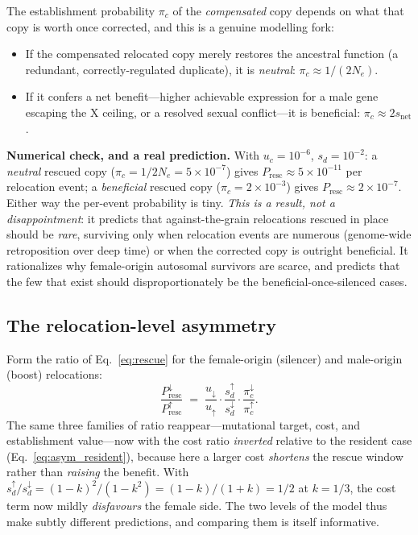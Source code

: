 \documentclass[11pt,a4paper]{article}
\newcommand{\Ne}{N_{e}}
\newcommand{\Presc}{P_{\mathrm{resc}}}
\begin{document}
The establishment probability $\pi_c$ of the \emph{compensated} copy depends on what that copy is worth once corrected, and this is a genuine modelling fork:
\begin{itemize}
\item If the compensated relocated copy merely restores the ancestral function (a redundant, correctly-regulated duplicate), it is \emph{neutral}: $\pi_c\approx 1/(2\Ne)$.
\item If it confers a net benefit---higher achievable expression for a male gene escaping the X ceiling, or a resolved sexual conflict---it is beneficial: $\pi_c\approx 2s_{\mathrm{net}}$.
\end{itemize}

\begin{checkpoint}
\textbf{Numerical check, and a real prediction.} With $u_c=10^{-6}$, $s_d=10^{-2}$: a \emph{neutral} rescued copy ($\pi_c=1/2\Ne=5\times10^{-7}$) gives $\Presc\approx 5\times10^{-11}$ per relocation event; a \emph{beneficial} rescued copy ($\pi_c=2\times10^{-3}$) gives $\Presc\approx 2\times10^{-7}$. Either way the per-event probability is tiny. \emph{This is a result, not a disappointment}: it predicts that against-the-grain relocations rescued in place should be \emph{rare}, surviving only when relocation events are numerous (genome-wide retroposition over deep time) or when the corrected copy is outright beneficial. It rationalizes why female-origin autosomal survivors are scarce, and predicts that the few that exist should disproportionately be the beneficial-once-silenced cases.
\end{checkpoint}

\subsection{The relocation-level asymmetry}

Form the ratio of Eq.~\eqref{eq:rescue} for the female-origin (silencer) and male-origin (boost) relocations:
\begin{equation}
\frac{\Presc^{\downarrow}}{\Presc^{\uparrow}} \;=\; \frac{u_{\downarrow}}{u_{\uparrow}}\cdot\frac{s_d^{\uparrow}}{s_d^{\downarrow}}\cdot\frac{\pi_c^{\downarrow}}{\pi_c^{\uparrow}}.
\label{eq:asym_reloc}
\end{equation}
The same three families of ratio reappear---mutational target, cost, and establishment value---now with the cost ratio \emph{inverted} relative to the resident case (Eq.~\ref{eq:asym_resident}), because here a larger cost \emph{shortens} the rescue window rather than \emph{raising} the benefit. With $s_d^{\uparrow}/s_d^{\downarrow}=(1-k)^2/(1-k^2)=(1-k)/(1+k)=1/2$ at $k=1/3$, the cost term now mildly \emph{disfavours} the female side. The two levels of the model thus make subtly different predictions, and comparing them is itself informative.
\end{document}

